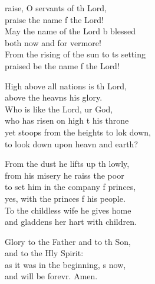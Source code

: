 \settowidth{\versewidth}{From the rising of the sun to its setting *}
\begin{psalmverse}%
  \begin{patverse}
raise, O servants of th Lord,\Med\\
praise the name f the Lord!\\
May the name of the Lord b blessed\Med\\
both now and for vermore!\\
From the rising of the sun to \pointup{\i}ts setting\Med\\
praised be the name f the Lord!

High above all nations is th Lord,\Med\\
above the heavns his glory.\\
Who is like the Lord, ur God,\Med\\
who has risen on high t his throne\\
yet stoops from the heights to lok down,\Med\\
to look down upon heavn and earth?

From the dust he lifts up th lowly,\Med\\
from his misery he raiss the poor\\
to set him in the company f princes,\Med\\
yes, with the princes f his people.\\
To the childless wife he gives  home\Med\\
and gladdens her hart with children.

Glory to the Father and to th Son,\Med\\
and to the Hly Spirit:\\
as it was in the beginning, \pointup{\i}s now,\Med\\
and will be forevr. Amen.
  \end{patverse}
\end{psalmverse}
